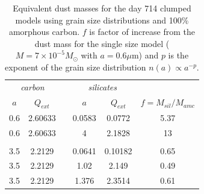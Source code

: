 \begin{table}
	\caption{Equivalent dust masses for the day 714 clumped models using grain size distributions and 100\% amorphous carbon. $f$ is factor of increase from the dust mass for the single size model ($M=7 \times 10^{-5} M_{\odot}$ with $a=0.6 \mu$m) and $p$ is the exponent of the grain size distribution $n(a) \propto a^{-p}$.}
	\label{tb_sil}
	\begin{center}
  	\begin{tabular}{@{} cccccc @{}}
    	\hline
	\multicolumn{2}{c}{\textit{carbon}} && \multicolumn{2}{c}{\textit{silicates}} & \\
$a$ & $Q_{ext}$ & &$a$& $Q_{ext}$ & $f=M_{sil}/M_{amc}$ \\
\hline
0.6 & 2.60633 & &0.0583 & 0.0772 & 5.37 \\
0.6 & 2.60633 & &4 & 2.1828 & 13 \\
 \\
3.5 & 2.2129 & &0.0641 & 0.10182 & 0.65 \\
3.5 & 2.2129 & &1.02 & 2.149 & 0.49 \\
3.5 & 2.2129 & &1.376 & 2.3514 & 0.61 \\


    \hline
  \end{tabular}
  \end{center}
\end{table}

